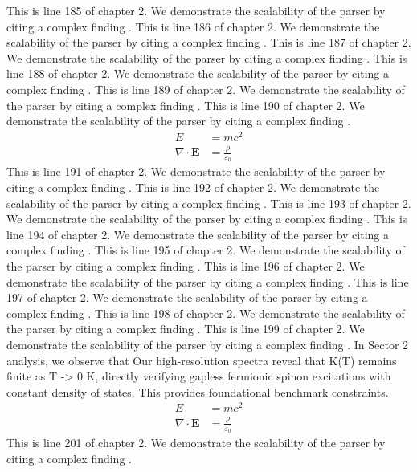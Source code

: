 This is line 185 of chapter 2. We demonstrate the scalability of the parser by citing a complex finding \cite{ref2_185}.
This is line 186 of chapter 2. We demonstrate the scalability of the parser by citing a complex finding \cite{ref2_186}.
This is line 187 of chapter 2. We demonstrate the scalability of the parser by citing a complex finding \cite{ref2_187}.
This is line 188 of chapter 2. We demonstrate the scalability of the parser by citing a complex finding \cite{ref2_188}.
This is line 189 of chapter 2. We demonstrate the scalability of the parser by citing a complex finding \cite{ref2_189}.
This is line 190 of chapter 2. We demonstrate the scalability of the parser by citing a complex finding \cite{ref2_190}.
\begin{align*}
  E &= mc^2 \\
  \nabla \cdot \mathbf{E} &= \frac{\rho}{\varepsilon_0}
\end{align*}
This is line 191 of chapter 2. We demonstrate the scalability of the parser by citing a complex finding \cite{ref2_191}.
This is line 192 of chapter 2. We demonstrate the scalability of the parser by citing a complex finding \cite{ref2_192}.
This is line 193 of chapter 2. We demonstrate the scalability of the parser by citing a complex finding \cite{ref2_193}.
This is line 194 of chapter 2. We demonstrate the scalability of the parser by citing a complex finding \cite{ref2_194}.
This is line 195 of chapter 2. We demonstrate the scalability of the parser by citing a complex finding \cite{ref2_195}.
This is line 196 of chapter 2. We demonstrate the scalability of the parser by citing a complex finding \cite{ref2_196}.
This is line 197 of chapter 2. We demonstrate the scalability of the parser by citing a complex finding \cite{ref2_197}.
This is line 198 of chapter 2. We demonstrate the scalability of the parser by citing a complex finding \cite{ref2_198}.
This is line 199 of chapter 2. We demonstrate the scalability of the parser by citing a complex finding \cite{ref2_199}.
In Sector 2 analysis, we observe that Our high-resolution spectra reveal that K(T) remains finite as T -> 0 K, directly verifying gapless fermionic spinon excitations with constant density of states. This provides foundational benchmark constraints.
\begin{align*}
  E &= mc^2 \\
  \nabla \cdot \mathbf{E} &= \frac{\rho}{\varepsilon_0}
\end{align*}
This is line 201 of chapter 2. We demonstrate the scalability of the parser by citing a complex finding \cite{ref2_201}.
